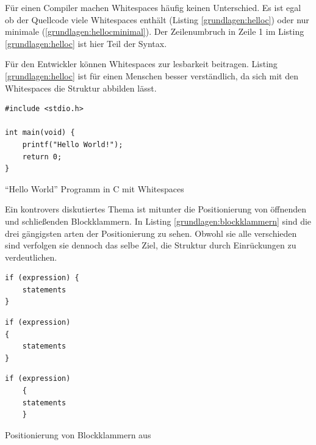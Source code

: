 Für einen Compiler machen Whitespaces häufig keinen Unterschied.
Es ist egal ob der Quellcode viele Whitespaces enthält (Listing \ref{grundlagen:helloc})
oder nur minimale (\ref{grundlagen:hellocminimal}).
Der Zeilenumbruch in Zeile 1 im Listing \ref{grundlagen:helloc} ist hier Teil der Syntax.

Für den Entwickler können Whitespaces zur lesbarkeit beitragen. Listing \ref{grundlagen:helloc}
ist für einen Menschen besser verständlich, da sich mit den Whitespaces die Struktur abbilden lässt.

\begin{listing}[H]
    \begin{verbatim}
#include <stdio.h>

int main(void) {
    printf("Hello World!");
    return 0;
}
    \end{verbatim}
    \caption{\enquote{Hello World} Programm in C mit Whitespaces}
    \label{grundlagen:helloc}
\end{listing}

Ein kontrovers diskutiertes Thema ist mitunter die Positionierung von öffnenden
und schließenden Blockklammern.
In Listing \ref{grundlagen:blockklammern} sind die drei gängigsten
arten der Positionierung zu sehen. Obwohl sie alle verschieden sind verfolgen
sie dennoch das selbe Ziel, die Struktur durch Einrückungen zu verdeutlichen.

\begin{listing}[H]
        \begin{minipage}{0.35\textwidth}
            \centering
	    \begin{verbatim}
if (expression) {
    statements
}
	    \end{verbatim}
        \end{minipage}
        \begin{minipage}{0.3\textwidth}
            \centering
	    \begin{verbatim}
if (expression)
{
    statements
}
	    \end{verbatim}
        \end{minipage}
        \begin{minipage}{0.3\textwidth}
            \centering
	    \begin{verbatim}
if (expression)
	{
    statements
	}
	    \end{verbatim}
        \end{minipage}
    \caption{Positionierung von Blockklammern aus \cite[S. 8]{Green}}
    \label{grundlagen:blockklammern}
\end{listing}

